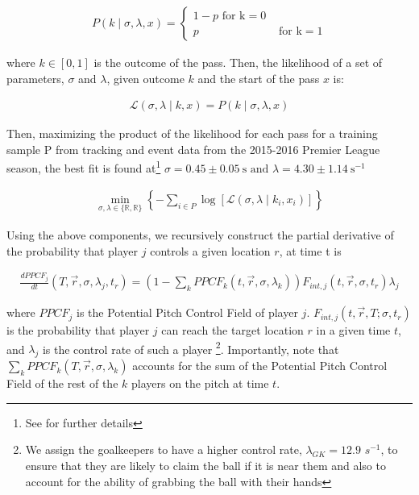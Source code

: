 \documentclass[
  10pt,
  twoside,nohyper]{book}
\begin{document}
\begin{align*}
P(k \mid \sigma, \lambda, x)=\left\{\begin{array}{lr}
1-p \text { for } \mathrm{k}=0 \\
p & \text { for } \mathrm{k}=1
\end{array}\right.
\end{align*}

where \(k \in [0,1]\) is the outcome of the pass. Then, the likelihood of a set of\\
parameters, \(\sigma\) and \(\lambda\), given outcome \(k\) and the start of the pass \(x\) is:

\begin{align*}
\mathcal{L}(\sigma, \lambda \mid k, x)=P(k \mid \sigma, \lambda, x)
\end{align*}

Then, maximizing the product of the likelihood for each pass for a training sample P from tracking and event data from the 2015-2016 Premier League season, the best fit is found at\footnote{See \autocite{SpearmanFit} for further details} \(\sigma=0.45 \pm 0.05 \mathrm{~s} \text { and } \lambda=4.30 \pm 1.14 \mathrm{~s}^{-1}\)

\begin{align*}
\min _{\sigma, \lambda \in\{\mathbb{R}, \mathbb{R}\}}\left\{-\sum_{i \in P} \log \left[\mathcal{L}\left(\sigma, \lambda \mid k_i, x_i\right)\right]\right\}
\end{align*}

Using the above components, we recursively construct the partial derivative of the probability that player \(j\) controls a given location \(r\), at time t is

\begin{align}
\frac{d P P C F_j}{d t}\left(T, \vec{r} , \sigma, \lambda_j, t_r\right)=\left(1-\sum_k P P C F_k\left(t, \vec{r} , \sigma, \lambda_k\right)\right) F_{int,j}(t, \vec{r}  , \sigma, t_r) \lambda_j
\label{eq:PC}
\end{align}

where \(PPCF_j\) is the Potential Pitch Control Field of player \(j\). \(F_{int,j}(t, \vec{r}, T ; \sigma, t_r)\) is the probability that player \(j\) can reach the target location \(r\) in a given time \(t\), and \(\lambda_j\) is the control rate of such a player \footnote{We assign the goalkeepers to have a higher control rate, \(\lambda_{GK} = 12.9\) \(s^{-1}\), to ensure that they are likely to claim the ball if it is near them and also to account for the ability of grabbing the ball with their hands}. Importantly, note that \(\sum_k P P C F_k\left(T, \vec{r} , \sigma, \lambda_k\right)\) accounts for the sum of the Potential Pitch Control Field of the rest of the \(k\) players on the pitch at time \(t\).
\end{document}
